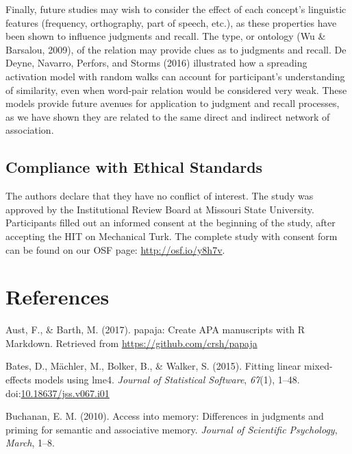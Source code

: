 \documentclass[english,,man]{apa6}
\begin{document}
Finally, future studies may wish to consider the effect of each concept's linguistic features (frequency, orthography, part of speech, etc.), as these properties have been shown to influence judgments and recall. The type, or ontology (Wu \& Barsalou, 2009), of the relation may provide clues as to judgments and recall. De Deyne, Navarro, Perfors, and Storms (2016) illustrated how a spreading activation model with random walks can account for participant's understanding of similarity, even when word-pair relation would be considered very weak. These models provide future avenues for application to judgment and recall processes, as we have shown they are related to the same direct and indirect network of association.

\hypertarget{compliance-with-ethical-standards}{%
\subsection{Compliance with Ethical Standards}\label{compliance-with-ethical-standards}}

The authors declare that they have no conflict of interest. The study was approved by the Institutional Review Board at Missouri State University. Participants filled out an informed consent at the beginning of the study, after accepting the HIT on Mechanical Turk. The complete study with consent form can be found on our OSF page: \url{http://osf.io/y8h7v}.

\newpage

\hypertarget{references}{%
\section{References}\label{references}}

\setlength{\parindent}{-0.5in}
\setlength{\leftskip}{0.5in}

\hypertarget{refs}{}
\leavevmode\hypertarget{ref-Aust2017}{}%
Aust, F., \& Barth, M. (2017). papaja: Create APA manuscripts with R Markdown. Retrieved from \url{https://github.com/crsh/papaja}

\leavevmode\hypertarget{ref-Bates2015}{}%
Bates, D., Mächler, M., Bolker, B., \& Walker, S. (2015). Fitting linear mixed-effects models using lme4. \emph{Journal of Statistical Software}, \emph{67}(1), 1--48. doi:\href{https://doi.org/10.18637/jss.v067.i01}{10.18637/jss.v067.i01}

\leavevmode\hypertarget{ref-Buchanan2010}{}%
Buchanan, E. M. (2010). Access into memory: Differences in judgments and priming for semantic and associative memory. \emph{Journal of Scientific Psychology}, \emph{March}, 1--8.
\end{document}
